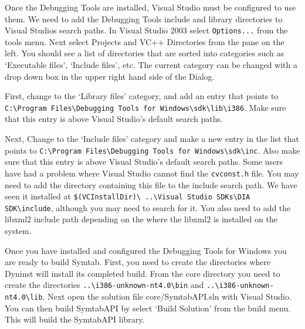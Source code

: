 Once the Debugging Tools are installed, Visual Studio must be configured to use
them. We need to add the Debugging Tools include and library directories to
Visual Studios search paths. In Visual Studio 2003 select \texttt{Options...} from the
tools menu. Next select Projects and VC++ Directories from the pane on the left.
You should see a list of directories that are sorted into categories such as
`Executable files', `Include files', etc. The current category can
be changed with a drop down box in the upper right hand side of the Dialog. 

First, change to the `Library files' category, and add an entry that
points to \\
\texttt{C:\textbackslash Program Files\textbackslash Debugging Tools
for Windows\textbackslash sdk\textbackslash lib\textbackslash i386}. Make sure
that this entry is above Visual Studio's default search paths.

Next, Change to the `Include files' category and make a new entry in the
list that points to \texttt{C:\textbackslash Program Files\textbackslash Debugging Tools for
Windows\textbackslash sdk\textbackslash inc}. Also
make sure that this entry is above Visual Studio's default search paths. Some
users have had a problem where Visual Studio cannot find the \texttt{cvconst.h} file. You
may need to add the directory containing this file to the include search path.
We have seen it installed at \texttt{\$(VCInstallDir)\textbackslash
    ..\textbackslash Visual Studio SDKs\textbackslash DIA
SDK\textbackslash include}, although you may need to search for it. You also need to add the
libxml2 include path depending on the where the libxml2 is installed on the
system.  

Once you have installed and configured the Debugging Tools for Windows
you are ready to build Symtab. First, you need to create the directories where
Dyninst will install its completed build. From the core directory you need to
create the directories \texttt{..\textbackslash i386-unknown-nt4.0\textbackslash bin} and
\texttt{..\textbackslash i386-unknown-nt4.0\textbackslash lib}.
Next open the solution file core/SymtabAPI.sln with Visual Studio.   You can
then build SymtabAPI by select `Build Solution' from the build menu. This
will build the SymtabAPI library.

